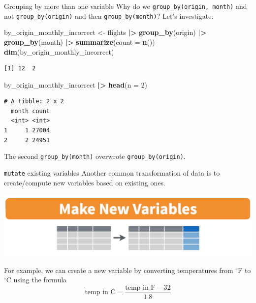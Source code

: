\documentclass[
  ignorenonframetext,
]{beamer}
\newenvironment{Shaded}{\begin{snugshade}}{\end{snugshade}}
\newcommand{\AttributeTok}[1]{\textcolor[rgb]{0.13,0.29,0.53}{#1}}
\newcommand{\DecValTok}[1]{\textcolor[rgb]{0.00,0.00,0.81}{#1}}
\newcommand{\FunctionTok}[1]{\textcolor[rgb]{0.13,0.29,0.53}{\textbf{#1}}}
\newcommand{\NormalTok}[1]{#1}
\newcommand{\OtherTok}[1]{\textcolor[rgb]{0.56,0.35,0.01}{#1}}
\newcommand{\SpecialCharTok}[1]{\textcolor[rgb]{0.81,0.36,0.00}{\textbf{#1}}}
\begin{document}
\begin{frame}[fragile]{Grouping by more than one variable}
\protect\hypertarget{grouping-by-more-than-one-variable-1}{}
Why do we \texttt{group\_by(origin,\ month)} and not
\texttt{group\_by(origin)} and then \texttt{group\_by(month)}? Let's
investigate:

\small

\begin{Shaded}
\begin{Highlighting}[]
\NormalTok{by\_origin\_monthly\_incorrect }\OtherTok{\textless{}{-}}\NormalTok{ flights }\SpecialCharTok{|\textgreater{}} 
  \FunctionTok{group\_by}\NormalTok{(origin) }\SpecialCharTok{|\textgreater{}} 
  \FunctionTok{group\_by}\NormalTok{(month) }\SpecialCharTok{|\textgreater{}} 
  \FunctionTok{summarize}\NormalTok{(}\AttributeTok{count =} \FunctionTok{n}\NormalTok{())}
\FunctionTok{dim}\NormalTok{(by\_origin\_monthly\_incorrect)}
\end{Highlighting}
\end{Shaded}

\begin{verbatim}
[1] 12  2
\end{verbatim}

\begin{Shaded}
\begin{Highlighting}[]
\NormalTok{by\_origin\_monthly\_incorrect }\SpecialCharTok{|\textgreater{}} \FunctionTok{head}\NormalTok{(}\AttributeTok{n =} \DecValTok{2}\NormalTok{)}
\end{Highlighting}
\end{Shaded}

\begin{verbatim}
# A tibble: 2 x 2
  month count
  <int> <int>
1     1 27004
2     2 24951
\end{verbatim}

\normalsize

The second \texttt{group\_by(month)} overwrote
\texttt{group\_by(origin)}.
\end{frame}

\begin{frame}{\texttt{mutate} existing variables}
\protect\hypertarget{mutate-existing-variables}{}
Another common transformation of data is to create/compute new variables
based on existing ones.

\begin{center}\includegraphics[width=0.8\linewidth,height=0.4\textheight]{week3_4} \end{center}

For example, we can create a new variable by converting temperatures
from \(^\circ\)F to \(^\circ\)C using the formula
\[\text{temp in C}=\frac{\text{temp in F}-32}{1.8}\]
\end{frame}
\end{document}
